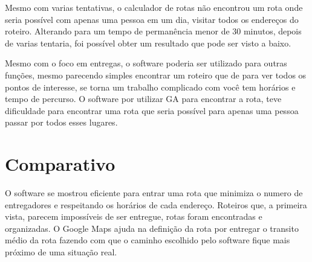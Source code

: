 Mesmo com varias tentativas, o calculador de rotas não encontrou um rota onde seria possível com apenas uma pessoa em um dia, visitar todos os endereços do roteiro. Alterando para um tempo de permanência menor de 30 minutos, depois de varias tentaria, foi possível obter um resultado que pode ser visto a baixo.

\begin{center}
	\label{fig:Turista}
\end{center}

Mesmo com o foco em entregas, o software poderia ser utilizado para outras funções, mesmo parecendo simples encontrar um roteiro que de para ver todos os pontos de interesse, se torna um trabalho complicado com você tem horários e tempo de percurso. O software por utilizar GA para encontrar a rota, teve dificuldade para encontrar uma rota que seria possível para apenas uma pessoa passar por todos esses lugares.

\pagebreak
\section{Comparativo}
O software se mostrou eficiente para entrar uma rota que minimiza o numero de entregadores e respeitando os horários de cada endereço. Roteiros que, a primeira vista, parecem impossíveis de ser entregue, rotas foram encontradas e organizadas.
O Google Maps ajuda na definição da rota por entregar o transito médio da rota fazendo com que o caminho escolhido pelo software fique mais próximo de uma situação real. 


